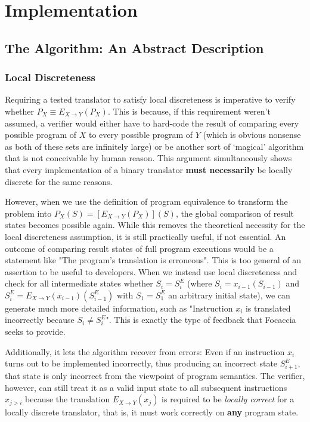 \chapter{Implementation}\label{chapter:implementation}

\section{The Algorithm: An Abstract Description}

\subsection{Local Discreteness}\label{sec:impl:local_discreteness}

Requiring a tested translator to satisfy local discreteness is imperative to verify whether $P_X \equiv E_{X \rightarrow
Y}(P_X)$. This is because, if this requirement weren't assumed, a verifier would either have to hard-code the result of
comparing every possible program of $X$ to every possible program of $Y$ (which is obvious nonsense as both of these
sets are infinitely large) or be another sort of `magical' algorithm that is not conceivable by human reason. This
argument simultaneously shows that every implementation of a binary translator \textbf{must necessarily} be locally
discrete for the same reasons.

However, when we use the definition of program equivalence to transform the problem into $P_X(S) = [E_{X \rightarrow
Y}(P_X)](S)$, the global comparison of result states becomes possible again. While this removes the theoretical
necessity for the local discreteness assumption, it is still practically useful, if not essential. An outcome of
comparing result states of full program executions would be a statement like "The program's translation is erroneous".
This is too general of an assertion to be useful to developers. When we instead use local discreteness and check for all
intermediate states whether $S_i = S^E_i$ (where $S_i = x_{i-1}(S_{i-1})$ and $S^E_i = E_{X \rightarrow
Y}(x_{i-1})(S^E_{i-1})$ with $S_1 = S^E_1$ an arbitrary initial state), we can generate much more detailed information,
such as "Instruction $x_i$ is translated incorrectly because $S_i \neq S^E_i$". This is exactly the type of feedback
that Focaccia seeks to provide.

Additionally, it lets the algorithm recover from errors: Even if an instruction $x_i$ turns out to be implemented
incorrectly, thus producing an incorrect state $S^E_{i+1}$, that state is only incorrect from the viewpoint of program
semantics. The verifier, however, can still treat it as a valid input state to all subsequent instructions $x_{j > i}$
because the translation $E_{X \rightarrow Y}(x_j)$ is required to be \textit{locally correct} for a locally discrete
translator, that is, it must work correctly on \textbf{any} program state.

